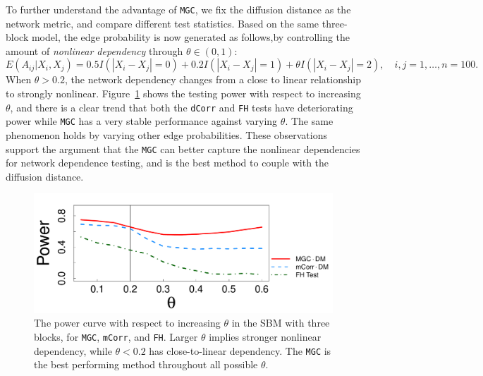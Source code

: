 \documentclass[11pt]{article}
\theoremstyle{definition}
\begin{document}
To further understand the advantage of \texttt{MGC}, we fix the diffusion distance as the network metric, and compare different test statistics. Based on the same three-block model, the edge probability is now generated as follows,by controlling the amount of \textit{nonlinear dependency} through $\theta \in (0, 1)$:
\begin{equation}
E(A_{ij} | X_{i}, X_{j}) = 0.5 I(|X_{i} - X_{j}| = 0) + 0.2 I(|X_{i} - X_{j}| = 1) + \theta I(|X_{i} - X_{j}| = 2), \quad i,j = 1, \ldots, n = 100.
\label{eq:mono}
\end{equation}
When $\theta > 0.2$, the network dependency changes from a close to linear relationship to strongly nonlinear. Figure~\ref{fig:powerplot} shows the testing power with respect to increasing $\theta$, and there is a clear trend that both the \texttt{dCorr} and \texttt{FH} tests have deteriorating power while \texttt{MGC} has a very stable performance against varying $\theta$. The same phenomenon holds by varying other edge probabilities. These observations support the argument that the \texttt{MGC} can better capture the nonlinear dependencies for network dependence testing, and is the best method to couple with the diffusion distance.
\begin{figure}[ht]
	\centering
	\includegraphics[width=0.7\linewidth]{mono.pdf}
	\caption{The power curve with respect to increasing $\theta$ in the SBM with three blocks, for \texttt{MGC}, \texttt{mCorr}, and \texttt{FH}. Larger $\theta$ implies stronger nonlinear dependency, while $\theta<0.2$ has close-to-linear dependency. The \texttt{MGC} is the best performing method throughout all possible $\theta$.} 
	\label{fig:powerplot}
\end{figure}
\end{document}
